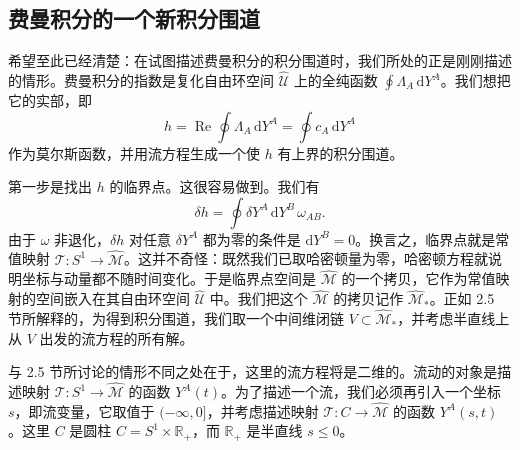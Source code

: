 \documentclass[11pt,a4paper,UTF8]{ctexart}
\theoremstyle{plain}
\theoremstyle{definition}
\begin{document}
\subsection{费曼积分的一个新积分围道}

希望至此已经清楚：在试图描述费曼积分的积分围道时，我们所处的正是刚刚描述的情形。费曼积分的指数是复化自由环空间 $\widehat{\mathcal U}$ 上的全纯函数 $\oint\Lambda_A\,\mathrm{d}Y^A$。我们想把它的实部，即
\begin{equation}
    h=\operatorname{Re}\oint\Lambda_A\,\mathrm{d}Y^A=\oint c_A\,\mathrm{d}Y^A
    \tag{2.34}
\end{equation}
作为莫尔斯函数，并用流方程生成一个使 $h$ 有上界的积分围道。


第一步是找出 $h$ 的临界点。这很容易做到。我们有
\begin{equation}
    \delta h=\oint \delta Y^A\,\mathrm{d}Y^B\,\omega_{AB}.
    \tag{2.35}
\end{equation}
由于 $\omega$ 非退化，$\delta h$ 对任意 $\delta Y^A$ 都为零的条件是 $\mathrm{d}Y^B=0$。换言之，临界点就是常值映射 $\mathcal T:S^1\to\widehat{\mathcal M}$。这并不奇怪：既然我们已取哈密顿量为零，哈密顿方程就说明坐标与动量都不随时间变化。于是临界点空间是 $\widehat{\mathcal M}$ 的一个拷贝，它作为常值映射的空间嵌入在其自由环空间 $\widehat{\mathcal U}$ 中。我们把这个 $\widehat{\mathcal M}$ 的拷贝记作 $\widehat{\mathcal M}_*$。正如 2.5 节所解释的，为得到积分围道，我们取一个中间维闭链 $V\subset\widehat{\mathcal M}_*$，并考虑半直线上从 $V$ 出发的流方程的所有解。


与 2.5 节所讨论的情形不同之处在于，这里的流方程将是二维的。流动的对象是描述映射 $\mathcal T:S^1\to\widehat{\mathcal M}$ 的函数 $Y^A(t)$。为了描述一个流，我们必须再引入一个坐标 $s$，即流变量，它取值于 $(-\infty,0]$，并考虑描述映射 $\mathcal T:C\to\widehat{\mathcal M}$ 的函数 $Y^A(s,t)$。这里 $C$ 是圆柱 $C=S^1\times\mathbb R_+$，而 $\mathbb R_+$ 是半直线 $s\le0$。
\end{document}
